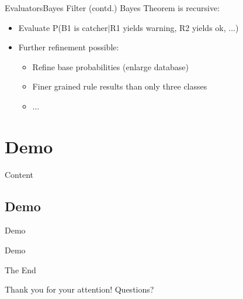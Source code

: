 \documentclass{beamer}
\newcommand{\tocsection}[1]{
  \section{#1}
  \begin{frame}{Content}
    \tableofcontents[sectionstyle=show/shaded,subsectionstyle=show/show/hide]
  \end{frame}
 }
\begin{document}
\begin{frame}{Evaluators}{Bayes Filter (contd.)}
Bayes Theorem is recursive:
\begin{itemize}
	\item Evaluate P(B1 is catcher$\vert$R1 yields warning, R2 yields ok, $\ldots$)
	\item Further refinement possible:
	\begin{itemize}
		\item Refine base probabilities (enlarge database)
		\item Finer grained rule results than only three classes
		\item $\ldots$
	\end{itemize}
\end{itemize}
\end{frame}

\tocsection{Demo}
\subsection{Demo}
\begin{frame}{Demo}
\begin{center}
	\huge{Demo}
\end{center}
\end{frame}

\begin{frame}{The End}
\begin{center}
	\huge{Thank you for your attention! Questions?}
\end{center}
\end{frame} 
\end{document}
